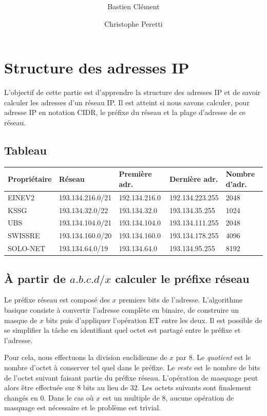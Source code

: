 \documentclass[11pt,a4paper]{article}
\author{Bastien Clément \and Christophe Peretti}
\title{{\normalsize \doccourse} \\ \doctitle }
\begin{document}
\maketitle
\vspace{1em}

\section{Structure des adresses IP}

L'objectif de cette partie est d'apprendre la structure des adresses IP et de savoir calculer les adresses d'un réseau IP. Il est atteint si nous savons calculer, pour adresse IP en notation CIDR, le préfixe du réseau et la plage d'adresse de ce réseau.

\subsection{Tableau}

\begin{tabular}{|l|l|l|l|l|}
	\hline	
	\textbf{Propriétaire} & \textbf{Réseau} & \textbf{Première adr.} & \textbf{Dernière adr.} & \textbf{Nombre d'adr.} \\
	\hline
	EINEV2 & 193.134.216.0/21 & 192.134.216.0 & 192.134.223.255 & 2048 \\
	KSSG & 193.134.32.0/22 & 193.134.32.0 & 193.134.35.255 & 1024 \\
	UBS & 193.134.104.0/21 & 193.134.104.0 & 193.134.111.255 & 2048 \\
	SWISSRE & 193.134.160.0/20 & 193.134.160.0 & 193.134.178.255 & 4096 \\
	SOLO-NET & 193.134.64.0/19 & 193.134.64.0 & 193.134.95.255 & 8192 \\
	\hline
\end{tabular}

\subsection{À partir de $a.b.c.d/x$ calculer le préfixe réseau}

Le préfixe réseau est composé des $x$ premiers bits de l'adresse. L'algorithme basique consiste à convertir l'adresse complète en binaire, de construire un masque de $x$ bits puis d'appliquer l'opération ET entre les deux. Il est possible de se simplifier la tâche en identifiant quel octet est partagé entre le préfixe et l'adresse.

Pour cela, nous effectuons la division euclidienne de $x$ par 8. Le \textit{quotient} est le nombre d'octet à conserver tel quel dans le préfixe. Le \textit{reste} est le nombre de bits de l'octet suivant faisant partie du préfixe réseau. L'opération de masquage peut alors être effectuée sur 8 bits au lieu de 32. Les octets suivants sont finalement changés en 0. 
Dans le cas où $x$ est un multiple de 8, aucune opération de masquage est nécessaire et le problème est trivial.
\end{document}
